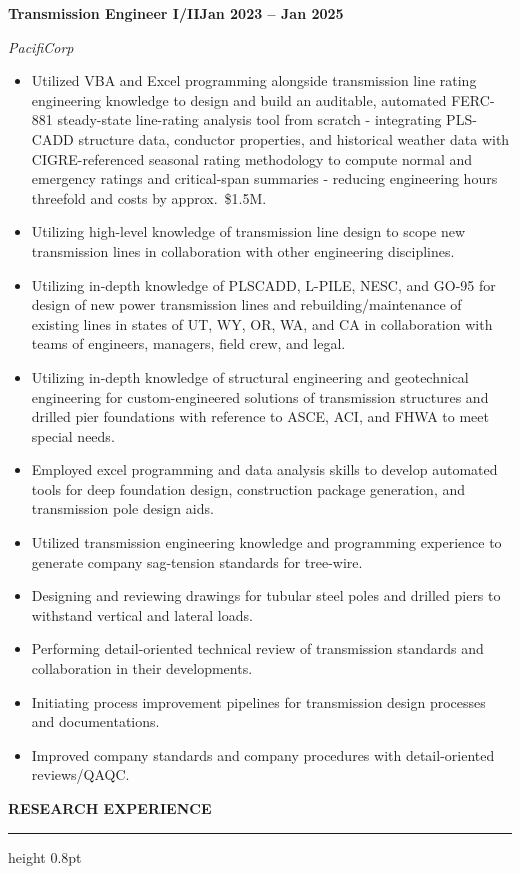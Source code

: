 \documentclass[10pt, letterpaper]{article}
\newcommand{\rsection}[1]{%
  \vspace{8pt}%
  {\large\bfseries\MakeUppercase{#1}}%
  \vspace{1pt}%
  \hrule height 0.8pt%
  \vspace{4pt}%
}
\newcommand{\jobline}[2]{%
  \vspace{5pt}%
  \noindent\textbf{#1}\hfill\textbf{#2}\par%
  \vspace{1pt}%
}
\newcommand{\subline}[1]{%
  \vspace{-1pt}%
  \noindent\textit{#1}\par%
  \vspace{1pt}%
}
\newenvironment{rlist}{%
  \begin{itemize}[leftmargin=1.4em, itemsep=1pt, topsep=2pt, parsep=0pt]%
}{%
  \end{itemize}%
}
\begin{document}
\jobline{Transmission Engineer I/II}{Jan 2023 -- Jan 2025}
\subline{PacifiCorp}
\begin{rlist}
  \item Utilized VBA and Excel programming alongside transmission line rating engineering knowledge to design and build an auditable, automated FERC-881 steady-state line-rating analysis tool from scratch - integrating PLS-CADD structure data, conductor properties, and historical weather data with CIGRE-referenced seasonal rating methodology to compute normal and emergency ratings and critical-span summaries - reducing engineering hours threefold and costs by approx.\ \$1.5M.
  \item Utilizing high-level knowledge of transmission line design to scope new transmission lines in collaboration with other engineering disciplines.
  \item Utilizing in-depth knowledge of PLSCADD, L-PILE, NESC, and GO-95 for design of new power transmission lines and rebuilding/maintenance of existing lines in states of UT, WY, OR, WA, and CA in collaboration with teams of engineers, managers, field crew, and legal.
  \item Utilizing in-depth knowledge of structural engineering and geotechnical engineering for custom-engineered solutions of transmission structures and drilled pier foundations with reference to ASCE, ACI, and FHWA to meet special needs.
  \item Employed excel programming and data analysis skills to develop automated tools for deep foundation design, construction package generation, and transmission pole design aids.
  \item Utilized transmission engineering knowledge and programming experience to generate company sag-tension standards for tree-wire.
  \item Designing and reviewing drawings for tubular steel poles and drilled piers to withstand vertical and lateral loads.
  \item Performing detail-oriented technical review of transmission standards and collaboration in their developments.
  \item Initiating process improvement pipelines for transmission design processes and documentations.
  \item Improved company standards and company procedures with detail-oriented reviews/QAQC.
\end{rlist}

\rsection{Research Experience}
\end{document}
